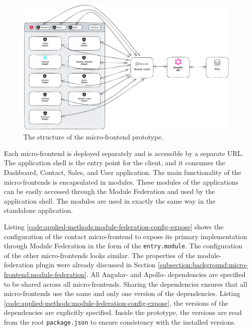 \ifshowImages
\begin{figure}[H]
  \centering
  \includegraphics[width=1\linewidth]{images/applied-methods/prototypical-implementation/host-architecture.png}
  \caption{The structure of the micro-frontend prototype.}\label{fig:applied-methods:prototype-micro-frontend-architecture}
\end{figure}
\fi

\noindent Each micro-frontend is deployed separately and is accessible by a separate \ac{URL}. The application shell is the entry point for the client, and it consumes the Dashboard, Contact, Sales, and User application. The main functionality of the micro-frontends is encapsulated in modules. These modules of the applications can be easily accessed through the Module Federation and used by the application shell. The modules are used in exactly the same way in the standalone application.

\bigskip

\noindent Listing \ref{code:applied-methods:module-federation-config-expose} shows the configuration of the contact micro-frontend to expose its primary implementation through Module Federation in the form of the \texttt{entry.module}. The configuration of the other micro-frontends looks similar. The properties of the module-federation plugin were already discussed in Section \ref{subsection:background:micro-frontend:module-federation}. All Angular- and Apollo- dependencies are specified to be shared across all micro-frontends. Sharing the dependencies ensures that all micro-frontends use the same and only one version of the dependencies. Listing \ref{code:applied-methods:module-federation-config-expose}, the versions of the dependencies are explicitly specified. Inside the prototype, the versions are read from the root \texttt{package.json} to ensure consistency with the installed versions.

